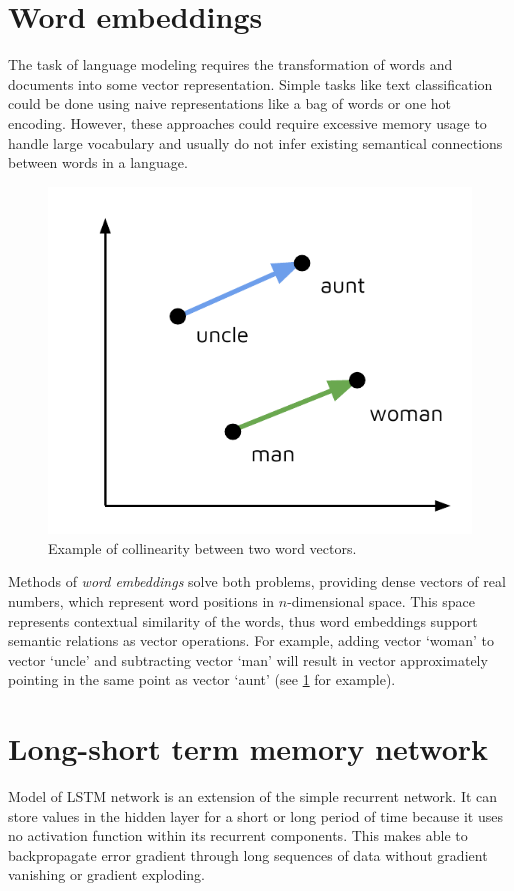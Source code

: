 
\section{Word embeddings}
The task of language modeling requires the transformation of words and documents into some vector representation. Simple tasks like text classification could be done using naive representations like a bag of words or one hot encoding. However, these approaches could require excessive memory usage to handle large vocabulary and usually do not infer existing semantical connections between words in a language. 

\begin{figure}
\centering
\includegraphics{Figures/word_embeddings}
\decoRule
\caption[Word vectors]{Example of collinearity between two word vectors.}
\label{fig:word_embeddings}
\end{figure}

Methods of \emph{word embeddings} solve both problems, providing dense vectors of real numbers, which represent word positions in $n$-dimensional space. This space represents contextual similarity of the words, thus word embeddings support semantic relations as vector operations. For example, adding vector ‘woman’ to vector ‘uncle’ and subtracting vector ‘man’ will result in vector approximately pointing in the same point as vector ‘aunt’ (see \ref{fig:word_embeddings} for example).

\section{Long-short term memory network}
Model of LSTM network is an extension of the simple recurrent network. It can store values in the hidden layer for a short or long period of time because it uses no activation function within its recurrent components. This makes able to backpropagate error gradient through long sequences of data without gradient vanishing or gradient exploding.

